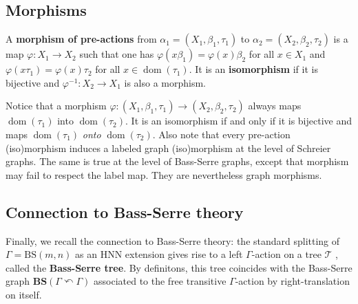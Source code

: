 \documentclass[12pt]{article}
\numberwithin{equation}{section}
\theoremstyle{definition}
\def\defin#1{\textbf{#1}}
\DeclareMathOperator{\dom}{\mathrm{dom}}
\newcommand{\inv}{^{-1}}
\newcommand\BSo{\mathrm{BS}}
\newcommand\BSe{\mathbf{BS}}
\newcommand\Tree{\mathcal{T}}
\begin{document}
\subsection{Morphisms}

A \defin{morphism of pre-actions} from \( \alpha_1 = (X_1,\beta_1, \tau_1) \)
to \( \alpha_2 = (X_2,\beta_2, \tau_2) \)
is a map \( \varphi:X_1 \to X_2 \) such that one has 
\( \varphi(x\beta_1) = \varphi(x)\beta_2 \) for all  \( x\in X_1 \)
and \(\varphi(x\tau_1) = \varphi(x)\tau_2 \) for all \( x\in \dom(\tau_1) \).
It is an \defin{isomorphism} if it is bijective and \( \varphi\inv : X_2 \to X_1 \) is also a morphism.

Notice that a morphism \( \varphi:(X_1,\beta_1,\tau_1)\to(X_2,\beta_2,\tau_2) \) 
always maps \(\dom(\tau_1)\) into \(\dom(\tau_2)\).
It is an isomorphism if and only if it is bijective
and maps \( \dom(\tau_1) \) \textit{onto} \( \dom(\tau_2) \).
Also note that every pre-action (iso)morphism induces a labeled graph (iso)morphism 
at the level of Schreier graphs.
The same is true at the level of Bass-Serre graphs, except that morphism
may fail to respect the label map. They are nevertheless graph morphisms. 

\subsection{Connection to Bass-Serre theory}\label{Subsect: connection to Bass-Serre theory}

Finally, we recall the connection to Bass-Serre theory: 
the standard splitting of \(\Gamma = \BSo(m,n)\) as an HNN extension
gives rise to a left $\Gamma$-action on a tree $\Tree$ \cite[Chapter I, §~5]{serre_Trees_1980},
called the \defin{Bass-Serre tree}.
By definitons, this tree coincides with the Bass-Serre graph \(\BSe(\Gamma\curvearrowleft\Gamma)\)
associated to the free transitive
\( \Gamma\)-action by right-translation on itself.



\end{document}
